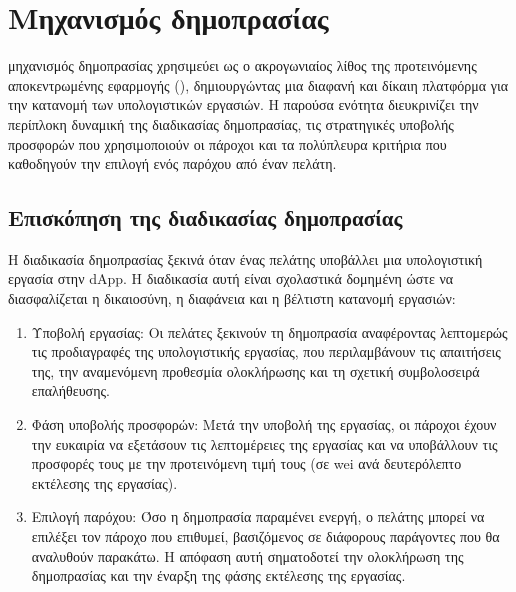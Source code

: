\chapter{Μηχανισμός δημοπρασίας}
 μηχανισμός δημοπρασίας χρησιμεύει ως ο ακρογωνιαίος λίθος της προτεινόμενης αποκεντρωμένης εφαρμογής (), δημιουργώντας μια διαφανή και δίκαιη πλατφόρμα για την κατανομή των υπολογιστικών εργασιών. Η παρούσα ενότητα διευκρινίζει την περίπλοκη δυναμική της διαδικασίας δημοπρασίας, τις στρατηγικές υποβολής προσφορών που χρησιμοποιούν οι πάροχοι και τα πολύπλευρα κριτήρια που καθοδηγούν την επιλογή ενός παρόχου από έναν πελάτη.

\section{Επισκόπηση της διαδικασίας δημοπρασίας}
Η διαδικασία δημοπρασίας ξεκινά όταν ένας πελάτης υποβάλλει μια υπολογιστική εργασία στην dApp. Η διαδικασία αυτή είναι σχολαστικά δομημένη ώστε να διασφαλίζεται η δικαιοσύνη, η διαφάνεια και η βέλτιστη κατανομή εργασιών:
\begin{enumerate}
    \item Υποβολή εργασίας: Οι πελάτες ξεκινούν τη δημοπρασία αναφέροντας λεπτομερώς τις προδιαγραφές της υπολογιστικής εργασίας, που περιλαμβάνουν τις απαιτήσεις της, την αναμενόμενη προθεσμία ολοκλήρωσης και τη σχετική συμβολοσειρά επαλήθευσης.
    \item Φάση υποβολής προσφορών: Μετά την υποβολή της εργασίας, οι πάροχοι έχουν την ευκαιρία να εξετάσουν τις λεπτομέρειες της εργασίας και να υποβάλλουν τις προσφορές τους με την προτεινόμενη τιμή τους (σε wei ανά δευτερόλεπτο εκτέλεσης της εργασίας).
    \item Επιλογή παρόχου: Όσο η δημοπρασία παραμένει ενεργή, ο πελάτης μπορεί να επιλέξει τον πάροχο που επιθυμεί, βασιζόμενος σε διάφορους παράγοντες που θα αναλυθούν παρακάτω. Η απόφαση αυτή σηματοδοτεί την ολοκλήρωση της δημοπρασίας και την έναρξη της φάσης εκτέλεσης της εργασίας.
\end{enumerate}

